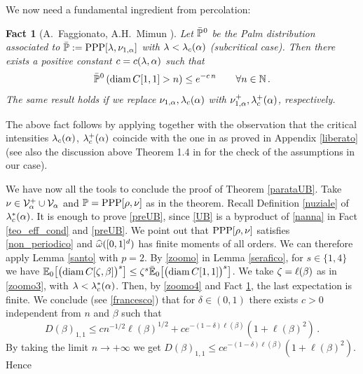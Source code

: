 \documentclass[12pt,a4paper,reqno]{amsart}
\newtheorem{Fact}[Theorem]{Fact}
\newcommand{\cV}{\ensuremath{\mathcal V}}
\newcommand{\bbE}{{\ensuremath{\mathbb E}} }
\newcommand{\bbN}{{\ensuremath{\mathbb N}} }
\newcommand{\bbP}{{\ensuremath{\mathbb P}} }
\let\a=\alpha \let\b=\beta   \let\d=\delta  \let\e=\varepsilon
\newcommand{\rosso}{\textcolor{black}} %
\newcommand{\vvv}{\textcolor{black}} %
\newcommand{\orc}{\textcolor{black}} %
\newcommand{\be}{\begin{equation}}
\newcommand{\en}{\end{equation}}
\newcommand{\cv}{\rosso{\cV_\alpha}}
\newcommand{\cvp}{\rosso{\cV^+_\alpha}}
\newcommand{\bvpz}{\vvv{{\bar\bbP}^{\hspace{0.013cm}0} }}
\begin{document}
We now need a fundamental ingredient from percolation:
\begin{Fact}[A.~Faggionato, A.H.~Mimun \cite{FagMim1}]\label{patatine} Let $\bvpz$ be the Palm distribution associated to $\bar \bbP:= {\rm PPP}[\l,\nu_{1,  \a}]$ with $\l<\l_c (\a)$ (subcritical case).
Then
there exists a positive constant $c=c(\l,\a)$  such that 
\be
\bvpz\left( {\rm diam}\,C [1, 1] > n   \right) \leq e^{- c \,n } \qquad 
 \forall n \in \bbN\,.
 \en
 The same result holds if we replace $\nu_{1,  \a}, \l_c (\a)$ with $\nu^+_{1,  \a}, \l^+_c (\a)$, respectively.
 \end{Fact}
The above fact follows by applying \cite[Thm.~1.4]{FagMim1} together with the observation that the critical intensities   $\l_c(\a)$, $\l_c^+(\a)$ coincide with the one in \cite[Eq.~(1.5)]{FagMim1} as proved in Appendix \ref{liberato} (see also the discussion above Theorem 1.4 in \cite{FagMim1} for the check of the assumptions in our case).

\smallskip

We have now all the tools to conclude the proof of Theorem \ref{parataUB}. Take \orc{$\nu\in \cvp \cup \cv$ and $\bbP= {\rm PPP}[\rho,\nu]$} as in the theorem.
Recall Definition \eqref{nuziale} of $\l_c^*(\a)$.
It is enough to prove \eqref{preUB}, since \eqref{UB} is a byproduct of \eqref{nanna} in Fact \ref{teo_eff_cond} and \eqref{preUB}.
We point out that ${\rm PPP}[\rho,\nu]$ satisfies \eqref{non_periodico} and $\widehat{\omega}([0,1]^d)$ has finite moments of all orders.
We can therefore  apply Lemma \ref{santo} with $p=2$. By \eqref{zoomo} in Lemma 
\ref{serafico},  for  $s\in \{1,4\}$  we have  $
\bbE_0\big[ \bigl({\rm diam}\, C[\z,\b]\bigr)^{s} \big]  \leq   \z^{s} \bar\bbE_0\big[ \bigl({\rm diam}\, C[1,1]\bigr)^{s}  \big]$.
We take $\z=\ell(\b)$ as in \eqref{zoomo3}, with $\l<\l_c^*(\a)$.
Then, 
by \eqref{zoomo4} and  Fact \ref{patatine},  the last expectation is finite.
We conclude (see \eqref{francesco})  that for $\d\in (0,1)$ there exists $c>0$ independent from $n$ and $\b$ such that
\[
  D(\b)_{1,1} \leq c n^{-1/2}  \ell(\b)^{1/2}+ c
  e^{-(1-\d)\ell(\b)} (1+ \ell(\b)^2)\,.
  \]
By taking the limit $n\to+\infty$ we get $ D(\b)_{1,1} \leq  c
  e^{-(1-\d)\ell(\b)} (1+ \ell(\b)^2)$. Hence
\end{document}
